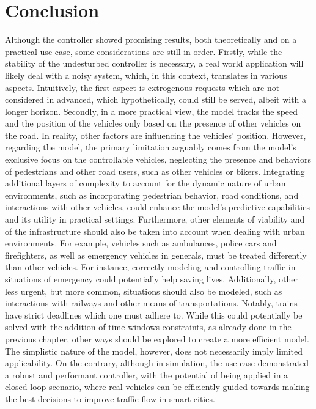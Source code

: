 \section{Conclusion}
Although the controller showed promising results, both theoretically and on a practical use case, some considerations are still in order. Firstly, while the stability of the undesturbed controller is necessary, a real world application will likely deal with a noisy system, which, in this context, translates in various aspects. Intuitively, the first aspect is extrogenous requests which are not considered in advanced, which hypothetically, could still be served, albeit with a longer horizon. Secondly, in a more practical view, the model tracks the speed and the position of the vehicles only based on the presence of other vehicles on the road. In reality, other factors are influencing the vehicles' position. However, regarding the model, the primary limitation arguably comes from the model's exclusive focus on the controllable vehicles, neglecting the presence and behaviors of pedestrians and other road users, such as other vehicles or bikers. Integrating additional layers of complexity to account for the dynamic nature of urban environments, such as incorporating pedestrian behavior, road conditions, and interactions with other vehicles, could enhance the model's predictive capabilities and its utility in practical settings. Furthermore, other elements of viability and of the infrastructure should also be taken into account when dealing with urban environments. For example, vehicles such as ambulances, police cars and firefighters, as well as emergency vehicles in generals, must be treated differently than other vehicles. For instance, correctly modeling and controlling traffic in situations of emergency could potentially help saving lives. Additionally, other less urgent, but more common, situations should also be modeled, such as interactions with railways and other means of transportations. Notably, trains have strict deadlines which one must adhere to. While this could potentially be solved with the addition of time windows constraints, as already done in the previous chapter, other ways should be explored to create a more efficient model. \\
The simplistic nature of the model, however, does not necessarily imply limited applicability. On the contrary, although in simulation, the use case demonstrated a robust and performant controller, with the potential of being applied in a closed-loop scenario, where real vehicles can be efficiently guided towards making the best decisions to improve traffic flow in smart cities. 